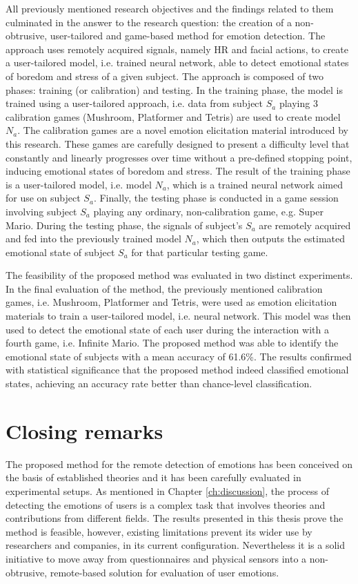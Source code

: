 All previously mentioned research objectives and the findings related to them culminated in the answer to the research question: the creation of a non-obtrusive, user-tailored and game-based method for emotion detection. The approach uses remotely acquired signals, namely HR and facial actions, to create a user-tailored model, i.e. trained neural network, able to detect emotional states of boredom and stress of a given subject. The approach is composed of two phases: training (or calibration) and testing. In the training phase, the model is trained using a user-tailored approach, i.e. data from subject $S_a$ playing 3 calibration games (Mushroom, Platformer and Tetris) are used to create model $N_a$. The calibration games are a novel emotion elicitation material introduced by this research. These games are carefully designed to present a difficulty level that constantly and linearly progresses over time without a pre-defined stopping point, inducing emotional states of boredom and stress. The result of the training phase is a user-tailored model, i.e. model $N_a$, which is a trained neural network aimed for use on subject $S_a$. Finally, the testing phase is conducted in a game session involving subject $S_a$ playing any ordinary, non-calibration game, e.g. Super Mario. During the testing phase, the signals of subject's $S_a$ are remotely acquired and fed into the previously trained model $N_a$, which then outputs the estimated emotional state of subject $S_a$ for that particular testing game.

The feasibility of the proposed method was evaluated in two distinct experiments. In the final evaluation of the method, the previously mentioned calibration games, i.e. Mushroom, Platformer and Tetris, were used as emotion elicitation materials to train a user-tailored model, i.e. neural network. This model was then used to detect the emotional state of each user during the interaction with a fourth game, i.e. Infinite Mario. The proposed method was able to identify the emotional state of subjects with a mean accuracy of 61.6\%. The results confirmed with statistical significance that the proposed method indeed classified emotional states, achieving an accuracy rate better than chance-level classification.

\section{Closing remarks}

The proposed method for the remote detection of emotions has been conceived on the basis of established theories and it has been carefully evaluated in experimental setups. As mentioned in Chapter \ref{ch:discussion}, the process of detecting the emotions of users is a complex task that involves theories and contributions from different fields. The results presented in this thesis prove the method is feasible, however, existing limitations prevent its wider use by researchers and companies, in its current configuration. Nevertheless it is a solid initiative to move away from questionnaires and physical sensors into a non-obtrusive, remote-based solution for evaluation of user emotions.

